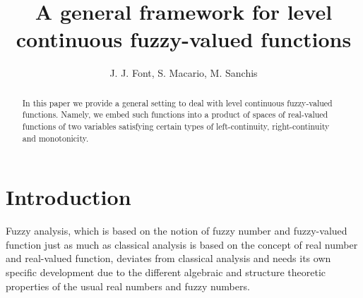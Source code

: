 \documentclass{amsart}
\begin{document}

\title[level continuous fuzzy-valued functions]{A general framework for level continuous fuzzy-valued functions}

\author{J. J. Font, S. Macario, M. Sanchis }


\address{Institut Universitari
de Matem\`{a}tiques i Aplicacions de Castell\'{o} (IMAC),
Universitat Jaume I, Avda. Sos Baynat s/n, 12071, Castell\'{o}
(Spain).}




\begin{abstract}
In this paper we provide a general setting to deal with level continuous fuzzy-valued functions. Namely, we embed such functions into a product of spaces of real-valued functions of two variables satisfying certain types of left-continuity, right-continuity and monotonicity.
\end{abstract}






\maketitle

\section{Introduction}


Fuzzy analysis, which is based on the
notion of fuzzy number and fuzzy-valued function just as much as classical analysis is based on the concept
of real number and real-valued function, deviates  from classical analysis and needs its own specific development due to the different algebraic and structure theoretic properties of the usual real numbers and fuzzy numbers.
\end{document}
